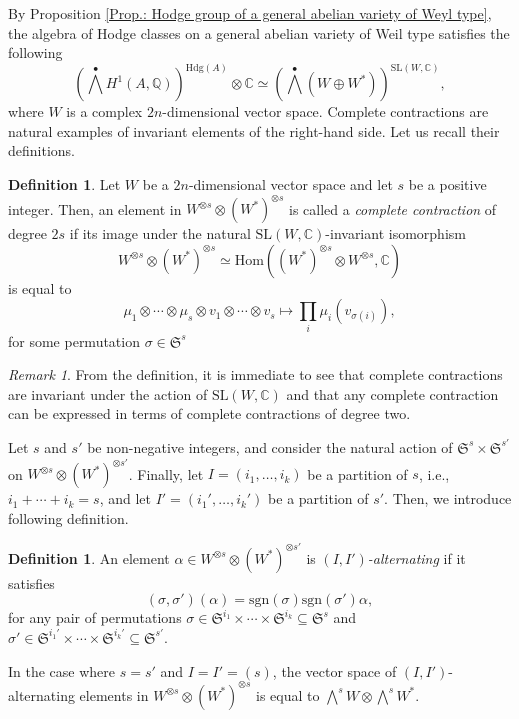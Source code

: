\documentclass[11pt,twoside,a4paper]{amsart}
\newcommand{\0}{\mathscr{O}}
\newcommand{\Q}{\mathbb{Q}}
\newcommand{\C}{\mathbb{C}}
\theoremstyle{plain}
\theoremstyle{definition}
\newtheorem{defn}[thm]{Definition}
\theoremstyle{remark}
\newtheorem{rmk}[thm]{Remark}
\begin{document}
By Proposition \ref{Prop.: Hodge group of a general abelian variety of Weyl type}, the algebra of Hodge classes on a general abelian variety of Weil type satisfies the following
\[
\textstyle\left(\bigwedge^{\bullet}H^1(A,\Q)\right)^{\mathrm{Hdg}(A)}\otimes \C\simeq \left(\bigwedge^{\bullet} (W\oplus W^*)\right)^{\mathrm{SL}(W,\C)},
\]
where $W$ is a complex $2n$-dimensional vector space. Complete contractions are natural examples of invariant elements of the right-hand side. Let us recall their definitions. 
\begin{defn}
Let $W$ be a $2n$-dimensional vector space and let $s$ be a positive integer. Then, an element in $W^{\otimes s}\otimes (W^*)^{\otimes s}$ is called a \textit{complete contraction} of degree $2s$ if its image under the natural $\mathrm{SL}(W,\C)$-invariant isomorphism 
\[W^{\otimes s}\otimes (W^*)^{\otimes s}\simeq
\mathrm{Hom}((W^*)^{\otimes s}\otimes W^{\otimes s},\C)
\] 
is equal to 
\[
\textstyle\mu_1\otimes\cdots\otimes\mu_s\otimes v_1\otimes\cdots\otimes v_s\mapsto \prod_i \mu_i(v_{\sigma(i)}),
\]
for some permutation $\sigma\in \mathfrak{S}^s$
\end{defn}

\begin{rmk}
\label{rmk.: complete contractions and degree-two complete contractions}
From the definition, it is immediate to see that complete contractions are invariant under the action of $\mathrm{SL}(W,\C)$ and that any complete contraction can be expressed in terms of complete contractions of degree two.
\end{rmk}
Let $s$ and $s'$ be non-negative integers, and consider the natural action of $\mathfrak{S}^{s}\times \mathfrak{S}^{s'}$ on
$W^{\otimes s}\otimes(W^*)^{\otimes s'}$. Finally, let $I=(i_1,\ldots,i_k)$ be a partition of $s$, i.e., $i_1+\cdots +i_k=s$, and let $I'=(i_1',\ldots,i_k')$ be a partition of $s'$. Then, we introduce following definition.
\begin{defn}
\label{defn: I-alternating contractions}
An element  $\alpha\in W^{\otimes s}\otimes(W^*)^{\otimes s'}$ is $(I,I')$\textit{-alternating} if it satisfies 
\[(\sigma,\sigma')(\alpha)=\text{sgn}(\sigma)\text{sgn}(\sigma')\alpha,\]
for any pair of permutations $\sigma\in\mathfrak{S}^{i_1}\times\cdots\times \mathfrak{S}^{i_k}\subseteq\mathfrak{S}^{s}$ and $\sigma'\in\mathfrak{S}^{i_1'}\times\cdots\times \mathfrak{S}^{i_k'}\subseteq\mathfrak{S}^{s'}$.
\end{defn}
In the case where $s=s'$ and $I=I'=(s)$, the vector space of $(I,I')$-alternating elements in $W^{\otimes s}\otimes(W^*)^{\otimes s}$ is equal to $\bigwedge^s W\otimes \bigwedge^s W^*$.
\end{document}
